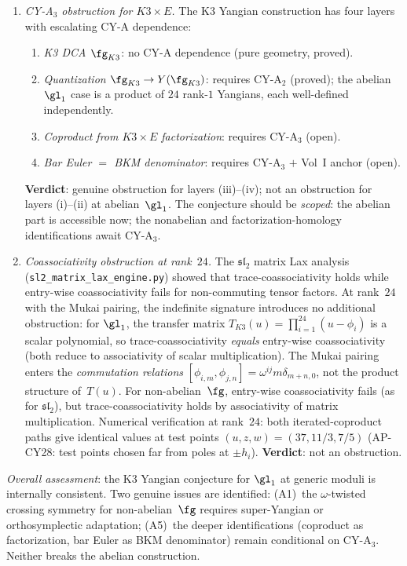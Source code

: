 \begin{remark}
\begin{enumerate}[label=\textbf{A\arabic*.}, leftmargin=2.5em]
\item \emph{CY-A$_3$ obstruction for $K3 \times E$.}
The K3 Yangian construction has four layers with escalating CY-A
dependence:
\begin{enumerate}[label=(\roman*)]
\item \emph{K3 DCA $\fg_{K3}$}: no CY-A dependence (pure geometry, proved).
\item \emph{Quantization $\fg_{K3} \to Y(\fg_{K3})$}: requires CY-A$_2$
  (proved); the abelian $\gl_1$ case is a product of $24$ rank-$1$
  Yangians, each well-defined independently.
\item \emph{Coproduct from $K3 \times E$ factorization}: requires CY-A$_3$
  (open).
\item \emph{Bar Euler $=$ BKM denominator}: requires CY-A$_3$ $+$
  Vol~I anchor (open).
\end{enumerate}
\textbf{Verdict}: genuine obstruction for layers (iii)--(iv);
not an obstruction for layers (i)--(ii) at abelian~$\gl_1$.
The conjecture should be \emph{scoped}: the abelian part is accessible
now; the nonabelian and factorization-homology identifications
await CY-A$_3$.

\item \emph{Coassociativity obstruction at rank~$24$.}
The $\mathfrak{sl}_2$ matrix Lax analysis
(\texttt{sl2\_matrix\_lax\_engine.py})
showed that trace-coassociativity holds while entry-wise coassociativity
fails for non-commuting tensor factors.  At rank~$24$ with the
Mukai pairing, the indefinite signature introduces no additional
obstruction: for $\gl_1$, the transfer matrix
$T_{K3}(u) = \prod_{i=1}^{24}(u - \phi_i)$ is a scalar polynomial,
so trace-coassociativity \emph{equals} entry-wise coassociativity
(both reduce to associativity of scalar multiplication).
The Mukai pairing enters the \emph{commutation relations}
$[\phi_{i,m}, \phi_{j,n}] = \omega^{ij} m \delta_{m+n,0}$,
not the product structure of~$T(u)$.
For non-abelian~$\fg$, entry-wise coassociativity fails (as for
$\mathfrak{sl}_2$), but trace-coassociativity holds by associativity
of matrix multiplication.
Numerical verification at rank~$24$: both iterated-coproduct paths
give identical values at test points $(u, z, w) = (37, 11/3, 7/5)$
(AP-CY28: test points chosen far from poles at $\pm h_i$).
\textbf{Verdict}: not an obstruction.
\end{enumerate}
\emph{Overall assessment}: the K3 Yangian conjecture for $\gl_1$ at
generic moduli is internally consistent.  Two genuine issues are
identified: (A1)~the $\omega$-twisted crossing symmetry for
non-abelian~$\fg$ requires super-Yangian or orthosymplectic
adaptation; (A5)~the deeper identifications (coproduct as
factorization, bar Euler as BKM denominator) remain conditional
on CY-A$_3$.  Neither breaks the abelian construction.
\end{remark}


